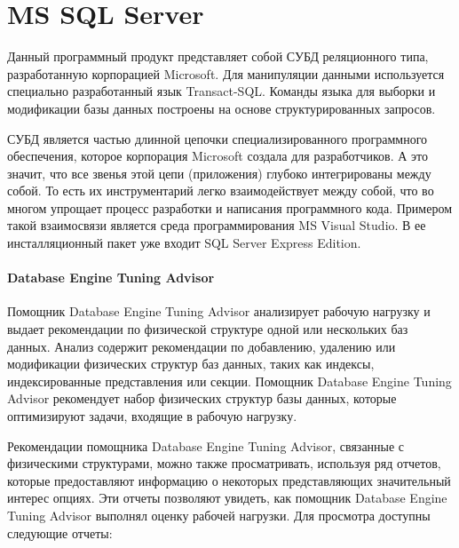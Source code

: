 \section{MS SQL Server}

Данный программный продукт представляет собой СУБД реляционного типа, разработанную корпорацией Microsoft. Для манипуляции данными используется специально разработанный язык Transact-SQL. Команды языка для выборки и модификации базы данных построены на основе структурированных запросов.

СУБД является частью длинной цепочки специализированного программного обеспечения, которое корпорация Microsoft создала для разработчиков. А это значит, что все звенья этой цепи (приложения) глубоко интегрированы между собой. То есть их инструментарий легко взаимодействует между собой, что во многом упрощает процесс разработки и написания программного кода. Примером такой взаимосвязи является среда программирования MS Visual Studio. В ее инсталляционный пакет уже входит SQL Server Express Edition. \cite{internet-technologies.ru:SQL-Server}


\paragraph{Database Engine Tuning Advisor}

Помощник Database Engine Tuning Advisor анализирует рабочую нагрузку и выдает рекомендации по физической структуре одной или нескольких баз данных. Анализ содержит рекомендации по добавлению, удалению или модификации физических структур баз данных, таких как индексы, индексированные представления или секции. Помощник Database Engine Tuning Advisor рекомендует набор физических структур базы данных, которые оптимизируют задачи, входящие в рабочую нагрузку.

Рекомендации помощника Database Engine Tuning Advisor, связанные с физическими структурами, можно также просматривать, используя ряд отчетов, которые предоставляют информацию о некоторых представляющих значительный интерес опциях. Эти отчеты позволяют увидеть, как помощник Database Engine Tuning Advisor выполнял оценку рабочей нагрузки. Для просмотра доступны следующие отчеты:

